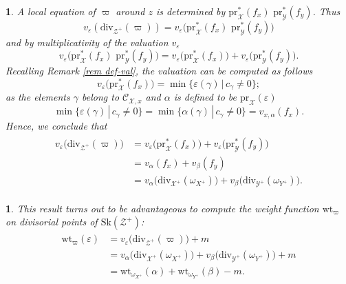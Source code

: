 \documentclass{amsart}%
\numberwithin{equation}{subsection}
\theoremstyle{plain2}
\theoremstyle{definition2}
\theoremstyle{stepstyle}
\theoremstyle{point}
\theoremstyle{subpoint}
\newtheorem{subpoint}[equation]{}%
\newcommand{\spa}[1]{\begin{subpoint}#1\end{subpoint}}           %
\newcommand{\cX}{\ensuremath{\mathscr{X}}}
\newcommand{\caC}{\ensuremath{\mathcal{C}}}
\newcommand{\cY}{\ensuremath{\mathscr{Y}}}
\newcommand{\cZ}{\ensuremath{\mathscr{Z}}}
\renewcommand{\cY}{\ensuremath{\mathscr{Y}}}
\newcommand{\pr}{\mathrm{pr}}
\newcommand{\divisor}{\mathrm{div}}
\newcommand{\weight}{\mathrm{wt}}
\newcommand{\Sk}{\mathrm{Sk}}
\begin{document}
\spa{A local equation of $\varpi$ around $z$ is determined by $\pr_{\cX}^*(f_x)\,\,\pr_{\cY}^*(f_y)$. Thus $$v_{\varepsilon}(\divisor_{\cZ^+}(\varpi))
= v_{\varepsilon}\big(\pr_{\cX}^*(f_x) \,\,\pr_{\cY}^*(f_y)\big)$$ and by multiplicativity of the valuation $v_{\varepsilon}$ $$v_{\varepsilon}\big(\pr_{\cX}^*(f_x) \,\,\pr_{\cY}^*(f_y)\big) = v_{\varepsilon}\big(\pr_{\cX}^*(f_x)\big) + v_{\varepsilon}\big(\pr_{\cY}^*(f_y)\big).$$ Recalling Remark \ref{rem def-val}, the valuation can be computed as follows $$ v_{\varepsilon}\big(\pr_{\cX}^*(f_x)\big) = \min\{\varepsilon(\gamma)\,|\,c_\gamma \neq 0\};$$ as the elements $\gamma$ belong to $\caC_{\cX,x}$ and $\alpha$ is defined to be $\pr_{\cX}(\varepsilon)$ $$\min\{\varepsilon(\gamma)\,|\,c_\gamma \neq 0\} = \min\{\alpha(\gamma)\,|\,c_\gamma \neq 0\} =  v_{x,\alpha}(f_x).$$ Hence, we conclude that \begin{align} \label{equ valuations product}
\begin{split}
v_{\varepsilon}\big(\divisor_{\cZ^+}(\varpi)\big)
& = v_{\varepsilon}\big(\pr_{\cX}^*(f_x)\big) + v_{\varepsilon}\big(\pr_{\cY}^*(f_y)\big)\\
& = v_{\alpha}(f_x) + v_{\beta}(f_y) \\
& = v_{\alpha}\big(\divisor_{\cX^+}(\omega_{X^+})\big) + v_{\beta}\big(\divisor_{\cY^+}(\omega_{Y^+})\big).
\end{split}
\end{align}
}

\spa{This result turns out to be advantageous to compute the weight function $\weight_\varpi$ on divisorial points of $\Sk(\cZ^+)$: 
\begin{align} \label{equ weight function product}
\begin{split}
\weight_\varpi(\varepsilon)
& = v_{\varepsilon}\big(\divisor_{\cZ^+}(\varpi)\big) +m \\
& = v_{\alpha}\big(\divisor_{\cX^+}(\omega_{X^+})\big) + v_{\beta}\big(\divisor_{\cY^+}(\omega_{Y^+})\big) + m \\
& = \weight_{\omega_{X^+}}(\alpha) + \weight_{\omega_{Y^+}}(\beta) - m.
\end{split}
\end{align}
}
\end{document}
